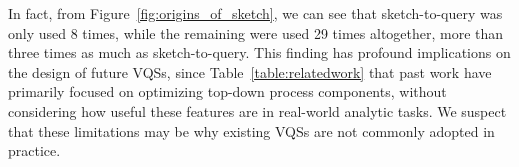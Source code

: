 In fact, from Figure~\ref{fig:origins_of_sketch},
we can see that sketch-to-query was only used
8 times, while the remaining  were used 29 times altogether,
more than three times as much as sketch-to-query.
This finding has profound implications
on the design of future VQSs, since Table~\ref{table:relatedwork}
 that past work have primarily focused
on optimizing top-down process components,
without considering how useful these features
are in real-world analytic tasks.
We suspect that these limitations
may be why existing VQSs are not commonly adopted in practice. %


